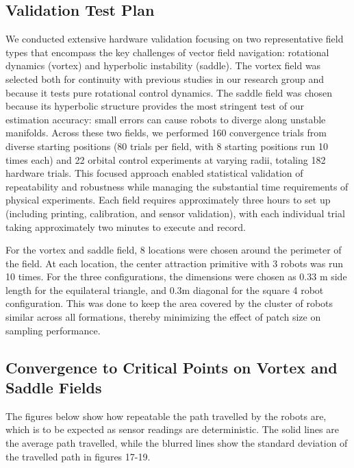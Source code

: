 \documentclass[lettersize,journal]{IEEEtran}
\begin{document}
\subsection{Validation Test Plan}

We conducted extensive hardware validation focusing on two representative field types that encompass the key challenges of vector field navigation: rotational dynamics (vortex) and hyperbolic instability (saddle). The vortex field was selected both for continuity with previous studies in our research group and because it tests pure rotational control dynamics. The saddle field was chosen because its hyperbolic structure provides the most stringent test of our estimation accuracy: small errors can cause robots to diverge along unstable manifolds. Across these two fields, we performed 160 convergence trials from diverse starting positions (80 trials per field, with 8 starting positions run 10 times each) and 22 orbital control experiments at varying radii, totaling 182 hardware trials. This focused approach enabled statistical validation of repeatability and robustness while managing the substantial time requirements of physical experiments. Each field requires approximately three hours to set up (including printing, calibration, and sensor validation), with each individual trial taking approximately two minutes to execute and record.


For the vortex and saddle field, 8 locations were chosen around the perimeter of the field. At each location, the center attraction primitive with 3 robots was run 10 times.
For the three configurations, the dimensions were chosen as 0.33 m side length for the equilateral triangle, and 0.3m diagonal for the square 4 robot configuration. This was done to keep the area covered by the cluster of robots similar across all formations, thereby minimizing the effect of patch size on sampling performance.







\subsection{Convergence to Critical Points on Vortex and Saddle Fields}



The figures below show how repeatable the path travelled by the robots are, which is to be expected as sensor readings are deterministic.
The solid lines are the average path travelled, while the blurred lines show the standard deviation of the travelled path in figures 17-19.
\end{document}
